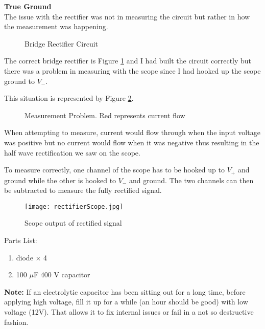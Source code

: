 \documentclass[oneside]{tufte-book}
\newenvironment{loggentry}[2]%
{\noindent\huge{\textbf{#2}}\normalsize\vspace{0.5cm}\marginnote{#1}\\}{\vspace{0.5cm}}
\begin{document}
  \begin{loggentry}{2018-Aug-29}{True Ground}

      The issue with the rectifier was not in measuring the circuit but rather in how the measurement was happening.

    \begin{figure}
        \centering
        
        \caption{Bridge Rectifier Circuit}
        \label{correctBridgeRectifier}
    \end{figure}

      The correct bridge rectifier is Figure \ref{correctBridgeRectifier} and I had built the circuit correctly but there was a problem in measuring with the scope since I had hooked up the scope ground to $V_-$.

      This situation is represented by Figure \ref{bridgeRectifierProblem}.

      \begin{figure}
          \centering
          
          \caption{Measurement Problem. Red represents current flow}
          \label{bridgeRectifierProblem}
      \end{figure}

      When attempting to measure, current would flow through when the input voltage was positive but no current would flow when it was negative thus resulting in the half wave rectification we saw on the scope.

      To measure correctly, one channel of the scope has to be hooked up to $V_+$ and ground while the other is hooked to $V_-$ and ground. The two channels can then be subtracted to measure the fully rectified signal.

      \begin{figure}
          \centering
          \texttt{[image: rectifierScope.jpg]}
          \caption{Scope output of rectified signal}
          \label{rectifierScope}
      \end{figure}

      Parts List:
      \begin{enumerate}
        \item diode $\times$ 4
        \item 100 $\mu$F 400 V capacitor
      \end{enumerate}

      \textbf{Note:} If an electrolytic capacitor has been sitting out for a long time, before applying high voltage, fill it up for a while (an hour should be good) with low voltage (12V). That allows it to fix internal issues or fail in a not so destructive fashion.

  \end{loggentry}
\end{document}
